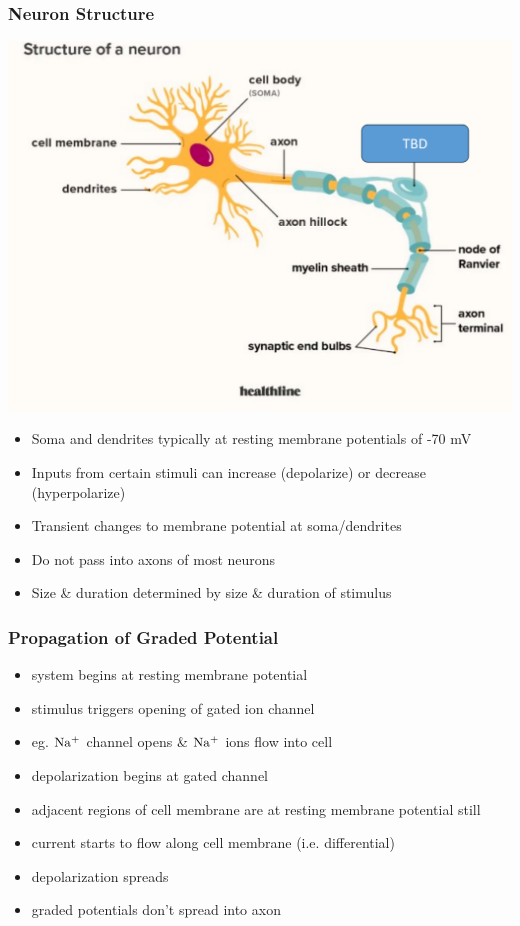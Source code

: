 \documentclass[11pt,fleqn]{book} %
\begin{document}
\subsubsection{Neuron Structure}
\begin{center}
    \includegraphics[width=0.65\linewidth]{Pictures/Screenshot 2024-02-25 224731.png}
\end{center}
\begin{itemize}
    \item Soma and dendrites typically at resting membrane potentials of -70 mV
    \item Inputs from certain stimuli can increase (depolarize) or decrease (hyperpolarize)
    \item Transient changes to membrane potential at soma/dendrites
    \item Do not pass into axons of most neurons
    \item Size \& duration determined by size \& duration of stimulus
\end{itemize}
\subsubsection{Propagation of Graded Potential}
\begin{itemize}
    \item system begins at resting membrane potential
    \item stimulus triggers opening of gated ion channel
    \item eg. $\rm{Na^+}$ channel opens \& $\rm{Na^+}$ ions flow into cell
    \item depolarization begins at gated channel
    \item adjacent regions of cell membrane are at resting membrane potential still
    \item current starts to flow along cell membrane (i.e. differential)
    \item depolarization spreads
    \item graded potentials don't spread into axon
\end{itemize}
\end{document}
